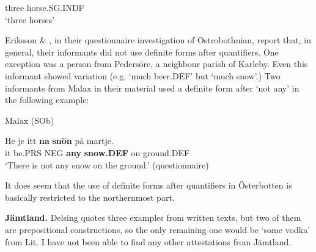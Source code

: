 three  horse.SG.INDF\\

\glt ‘three horses’

\z

Eriksson \& \citet[26]{Rendahl1999}, in their questionnaire investigation of Ostrobothnian, report that, in general, their informants did not use definite forms after quantifiers. One exception was a person from Pedersöre, a neighbour parish of Karleby. Even this informant showed variation (e.g.  ‘much beer.DEF’ but  ‘much snow’.) Two informants from Malax in their material used a definite form after  ‘not any’ in the following example:


\item 

Malax (SOb)



 \ea\label{}
\gll He  je  itt  \textbf{na} \textbf{snön} på  martje.\\


it  be.PRS  NEG  \textbf{any} \textbf{snow.DEF} on  ground.DEF\\

\glt ‘There is not any snow on the ground.’ (questionnaire)

\z

It does seem that the use of definite forms after quantifiers in Österbotten is basically restricted to the northernmost part.


\textbf{Jämtland. }Delsing quotes three examples from written texts, but two of them are prepositional constructions, so the only remaining one would be  ‘some vodka’ from Lit. I have not been able to find any other attestations from Jämtland.

